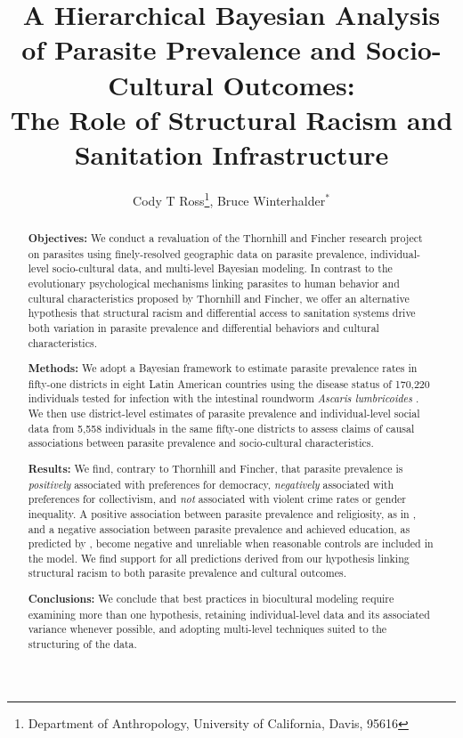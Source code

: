 \documentclass[12pt]{article}
\title{\textbf{A Hierarchical Bayesian Analysis of Parasite Prevalence and Socio-Cultural Outcomes:} \\
The Role of Structural Racism and Sanitation Infrastructure  }
\author{Cody T Ross\thanks{Department of Anthropology, University of California, Davis, 95616}, Bruce Winterhalder$^*$
}
\begin{document}
\maketitle

\begin{small}
\begin{abstract}
\textbf{Objectives:} We conduct a revaluation of the Thornhill and Fincher research project on parasites using finely-resolved geographic data on parasite prevalence, individual-level socio-cultural data, and multi-level Bayesian modeling. In contrast to the evolutionary psychological mechanisms linking parasites to human behavior and cultural characteristics proposed by Thornhill and Fincher, we offer an alternative hypothesis that structural racism and differential access to sanitation systems drive both variation in parasite prevalence and differential behaviors and cultural characteristics.
 
\textbf{Methods:}	We adopt a Bayesian framework to estimate parasite prevalence rates in fifty-one districts in eight Latin American countries using the disease status of 170,220 individuals tested for infection with the intestinal roundworm \textit{Ascaris lumbricoides} \citep{Hurlimann2011}. We then use district-level estimates of parasite prevalence and individual-level social data from 5,558 individuals in the same fifty-one districts \citep{LB2008} to assess claims of causal associations between parasite prevalence and socio-cultural characteristics.
 
\textbf{Results:} We find, contrary to Thornhill and Fincher, that parasite prevalence is \textit{positively} associated with preferences for democracy, \textit{negatively} associated with preferences for collectivism, and \textit{not} associated with violent crime rates or gender inequality.  A positive association between parasite prevalence and religiosity, as in \citet{Fincher2012}, and a negative association between parasite prevalence and achieved education, as predicted by \citet{Eppig2010}, become negative and unreliable when reasonable controls are included in the model.  We find support for all predictions derived from our hypothesis linking structural racism to both parasite prevalence and cultural outcomes. 

\textbf{Conclusions: }We conclude that best practices in biocultural modeling require examining more than one hypothesis, retaining individual-level data and its associated variance whenever possible, and adopting multi-level techniques suited to the structuring of the data.  
 \end{abstract}
\end{small}
\end{document}
